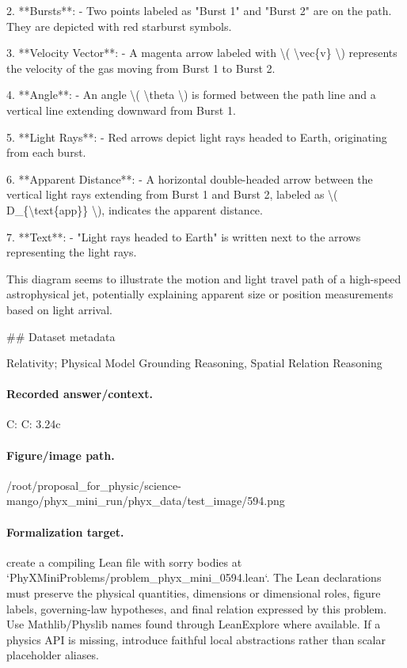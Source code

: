 2. **Bursts**: 
   - Two points labeled as "Burst 1" and "Burst 2" are on the path. They are depicted with red starburst symbols.
   
3. **Velocity Vector**: 
   - A magenta arrow labeled with \textbackslash{}( \textbackslash{}vec\{v\} \textbackslash{}) represents the velocity of the gas moving from Burst 1 to Burst 2.
   
4. **Angle**: 
   - An angle \textbackslash{}( \textbackslash{}theta \textbackslash{}) is formed between the path line and a vertical line extending downward from Burst 1.

5. **Light Rays**:
   - Red arrows depict light rays headed to Earth, originating from each burst.

6. **Apparent Distance**:
   - A horizontal double-headed arrow between the vertical light rays extending from Burst 1 and Burst 2, labeled as \textbackslash{}( D\_\{\textbackslash{}text\{app\}\} \textbackslash{}), indicates the apparent distance.

7. **Text**:
   - "Light rays headed to Earth" is written next to the arrows representing the light rays.

This diagram seems to illustrate the motion and light travel path of a high-speed astrophysical jet, potentially explaining apparent size or position measurements based on light arrival.

\#\# Dataset metadata

Relativity; Physical Model Grounding Reasoning, Spatial Relation Reasoning

\paragraph{Recorded answer/context.}
C: C: 3.24c

\paragraph{Figure/image path.}
/root/proposal\_for\_physic/science-mango/phyx\_mini\_run/phyx\_data/test\_image/594.png

\paragraph{Formalization target.}
create a compiling Lean file with sorry bodies at `PhyXMiniProblems/problem\_phyx\_mini\_0594.lean`. The Lean declarations must preserve the physical quantities, dimensions or dimensional roles, figure labels, governing-law hypotheses, and final relation expressed by this problem.
Use Mathlib/Physlib names found through LeanExplore where available. If a physics API is missing, introduce faithful local abstractions rather than scalar placeholder aliases.

